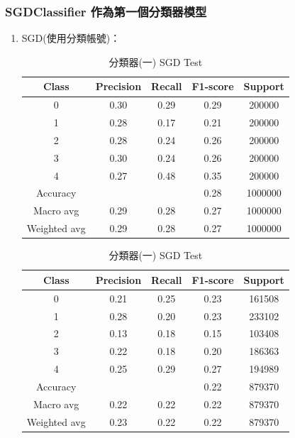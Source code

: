     \subsubsection{SGDClassifier 作為第一個分類器模型}
    \begin{enumerate}

        \item SGD(使用分類帳號)：

        \begin{table}[H]
        \centering
        \scriptsize
        \begin{minipage}{0.48\textwidth}
        \centering
        \begin{tabular}{c|cccc}
        \hline
        Class & Precision & Recall & F1-score & Support \\
        \hline
        0 & 0.30 & 0.29 & 0.29 & 200000 \\
        1 & 0.28 & 0.17 & 0.21 & 200000 \\
        2 & 0.28 & 0.24 & 0.26 & 200000 \\
        3 & 0.30 & 0.24 & 0.26 & 200000 \\
        4 & 0.27 & 0.48 & 0.35 & 200000 \\
        \hline
        Accuracy &       &      & 0.28 & 1000000 \\
        Macro avg & 0.29 & 0.28 & 0.27 & 1000000 \\
        Weighted avg & 0.29 & 0.28 & 0.27 & 1000000 \\
        \hline
        \end{tabular}
        \caption{分類器(一) SGD Train}
        \label{tab:classifier_1_report_train_sgd_filtered}
        \end{minipage}%
        \hfill
        \begin{minipage}{0.48\textwidth}
        \centering
        \begin{tabular}{c|cccc}
        \hline
        Class & Precision & Recall & F1-score & Support \\
        \hline
        0 & 0.21 & 0.25 & 0.23 & 161508 \\
        1 & 0.28 & 0.20 & 0.23 & 233102 \\
        2 & 0.13 & 0.18 & 0.15 & 103408 \\
        3 & 0.22 & 0.18 & 0.20 & 186363 \\
        4 & 0.25 & 0.29 & 0.27 & 194989 \\
        \hline
        Accuracy &       &      & 0.22 & 879370 \\
        Macro avg & 0.22 & 0.22 & 0.22 & 879370 \\
        Weighted avg & 0.23 & 0.22 & 0.22 & 879370 \\
        \hline
        \end{tabular}
        \caption{分類器(一) SGD Test}
        \label{tab:classifier_1_report_test_sgd_filtered}
        \end{minipage}
        \end{table}


\end{enumerate}

